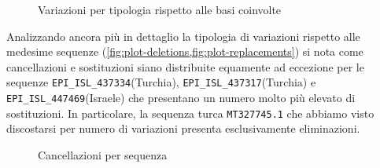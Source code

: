 \documentclass[11pt,italian]{article}
\begin{document}
\begin{figure}[H]
  \caption{Variazioni per tipologia rispetto alle basi coinvolte}
  \label{fig:plot-alterations}
\end{figure}

\noindent
Analizzando ancora più in dettaglio la tipologia di variazioni rispetto alle medesime sequenze (\cref{fig:plot-deletions,fig:plot-replacements}) si nota come cancellazioni e sostituzioni siano distribuite equamente ad eccezione per le sequenze \lstinline{EPI_ISL_437334}(Turchia), \lstinline{EPI_ISL_437317}(Turchia) e \lstinline{EPI_ISL_447469}(Israele) che presentano un numero molto più elevato di sostituzioni. In particolare, la sequenza turca \lstinline{MT327745.1} che abbiamo visto discostarsi per numero di variazioni presenta esclusivamente eliminazioni.

\begin{figure}[H]
  \caption{Cancellazioni per sequenza}
  \label{fig:plot-deletions}
\end{figure}
\end{document}
